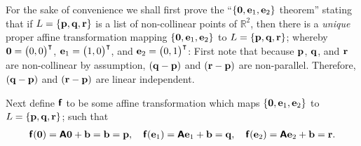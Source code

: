 {\color{OliveGreen}
\bproof
For the sake of convenience we shall first prove  the ``$\{{\bf 0},{\bf e}_1,{\bf e}_2\}$ theorem'' stating that
if $L=\{{\bf p},{\bf q},{\bf r}\}$
is a list of non-collinear points of $\mathbb{R}^2$, then
there is a {\em unique}  proper affine transformation  mapping
$\{{\bf 0},{\bf e}_1,{\bf e}_2\}$ to $L=\{{\bf p},{\bf q},{\bf r}\}$;
whereby
${\bf 0}= \begin{pmatrix} 0,0\end{pmatrix}^\intercal$,
${\bf e}_1= \begin{pmatrix} 1,0\end{pmatrix}^\intercal$,
and
${\bf e}_2= \begin{pmatrix} 0,1\end{pmatrix}^\intercal$:
First note that because ${\bf p}$, ${\bf q}$, and ${\bf r}$ are non-collinear by assumption,
$({\bf q}-{\bf p})$ and $({\bf r}-{\bf p})$ are non-parallel.
Therefore, $({\bf q}-{\bf p})$ and $({\bf r}-{\bf p})$ are linear independent.

Next define $\textsf{\textbf{f}}$ to be some affine transformation
which maps $\{{\bf 0},{\bf e}_1,{\bf e}_2\}$ to $L=\{{\bf p},{\bf q},{\bf r}\}$;
such that
\begin{equation}
\begin{split}
\textsf{\textbf{f}}({\bf 0})= \textsf{\textbf{A}}{\bf 0} + {\bf b}= {\bf b} = {\bf p} ,\quad
\textsf{\textbf{f}}({\bf e}_1)= \textsf{\textbf{A}}{\bf e}_1 + {\bf b} = {\bf q},\quad
\textsf{\textbf{f}}({\bf e}_2)= \textsf{\textbf{A}}{\bf e}_2 + {\bf b} = {\bf r}
.
\end{split}
\label{2018-mm-ch-projgeom-0-pqr}
\end{equation}

}
